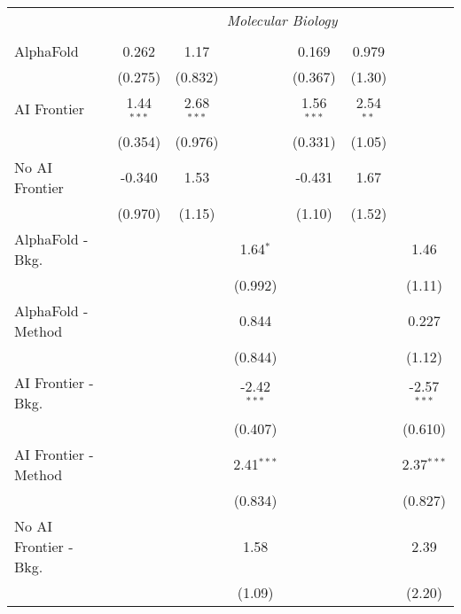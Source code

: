 \begin{tabular}{lcccccc}
 & \multicolumn{6}{c}{\textit{Molecular Biology}} \\ \\
   AlphaFold               & 0.262        & 1.17         &               & 0.169        & 0.979       &   \\   
                           & (0.275)      & (0.832)      &               & (0.367)      & (1.30)      &   \\   
   AI Frontier             & 1.44$^{***}$ & 2.68$^{***}$ &               & 1.56$^{***}$ & 2.54$^{**}$ &   \\   
                           & (0.354)      & (0.976)      &               & (0.331)      & (1.05)      &   \\   
   No AI Frontier          & -0.340       & 1.53         &               & -0.431       & 1.67        &   \\   
                           & (0.970)      & (1.15)       &               & (1.10)       & (1.52)      &   \\   
   AlphaFold - Bkg.        &              &              & 1.64$^{*}$    &              &             & 1.46\\   
                           &              &              & (0.992)       &              &             & (1.11)\\   
   AlphaFold - Method      &              &              & 0.844         &              &             & 0.227\\   
                           &              &              & (0.844)       &              &             & (1.12)\\   
   AI Frontier - Bkg.      &              &              & -2.42$^{***}$ &              &             & -2.57$^{***}$\\   
                           &              &              & (0.407)       &              &             & (0.610)\\   
   AI Frontier - Method    &              &              & 2.41$^{***}$  &              &             & 2.37$^{***}$\\   
                           &              &              & (0.834)       &              &             & (0.827)\\   
   No AI Frontier - Bkg.   &              &              & 1.58          &              &             & 2.39\\   
                           &              &              & (1.09)        &              &             & (2.20)\\   

\end{tabular}
